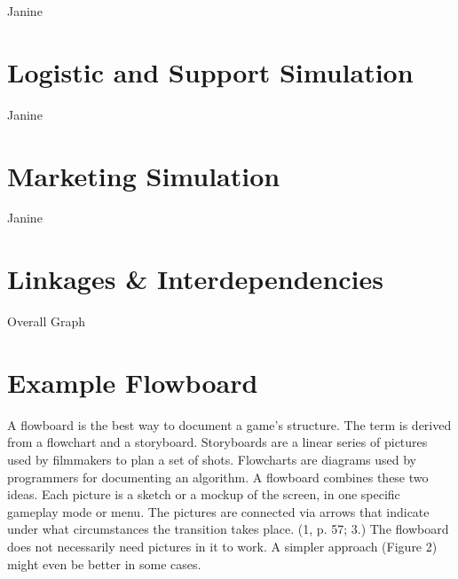 \documentclass[11pt,titlepage,oneside,openany]{book}
\begin{document}
Janine\ \\


\section{Logistic and Support Simulation}
Janine\ \\




\section{Marketing Simulation}
Janine\ \\











\section{Linkages \& Interdependencies}
\label{sec:link}
Overall Graph

\section{Example Flowboard}
A flowboard is the best way to document a game’s structure. The term is derived
from a flowchart and a storyboard. Storyboards are a linear series of pictures
used by filmmakers to plan a set of shots. Flowcharts are diagrams used
by programmers for documenting an algorithm. A flowboard combines these
two ideas. Each picture is a sketch or a mockup of the screen, in one specific
gameplay mode or menu. The pictures are connected via arrows that indicate
under what circumstances the transition takes place. (1, p. 57; 3.) The flowboard
does not necessarily need pictures in it to work. A simpler approach (Figure
2) might even be better in some cases.
\end{document}
